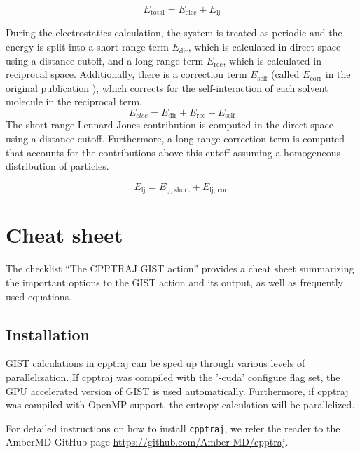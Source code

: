 \documentclass[9pt,tutorial]{livecoms}
\newcommand{\software}{\texttt}
\begin{document}
\begin{equation}
	E_\text{total} = E_\text{elec} + E_\text{lj}
\end{equation}

During the electrostatics calculation, the system is treated as periodic and the energy is split into a short-range term $E_\text{dir}$, which is calculated in direct space using a distance cutoff, and a long-range term $E_\text{rec}$, which is calculated in reciprocal space.
Additionally, there is a correction term $E_\text{self}$ (called $E_\text{corr}$ in the original publication \cite{Chen2021}), which corrects for the self-interaction of each solvent molecule in the reciprocal term.
\begin{equation}
	E_\textit{elec} = E_\text{dir} + E_\text{rec} + E_\text{self}
\end{equation}
The short-range Lennard-Jones contribution is computed in the direct space using a distance cutoff.
Furthermore, a long-range correction term is computed that accounts for the contributions above this cutoff assuming a homogeneous distribution of particles.

\begin{equation}
	E_\text{lj} = E_\text{lj,\ short} +  E_\text{lj,\ corr}
\end{equation}

\section{Cheat sheet}
The checklist ``The CPPTRAJ GIST action'' provides a cheat sheet summarizing the important options to the GIST action and its output, as well as frequently used equations.

\subsection{Installation}
GIST calculations in cpptraj can be sped up through various levels of 
parallelization.
If cpptraj was compiled with the '-cuda' configure flag set, the GPU accelerated version of GIST is used automatically. 
Furthermore, if cpptraj was compiled with OpenMP support, the entropy calculation will be parallelized.

For detailed instructions on how to install \software{cpptraj}, we refer the reader to the AmberMD GitHub page \url{https://github.com/Amber-MD/cpptraj}.
\end{document}

